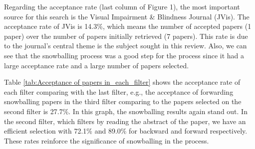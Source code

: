  	\begin{figure}[h] 
   	    \captionsetup{width=16cm}%
	\end{figure}

Regarding the acceptance rate (last column of Figure 1), the most important source for this search is the Visual Impairment \& Blindness Journal (\gls{JVis}). The acceptance rate of \gls{JVis} is 14.3\%, which means the number of accepted papers (1 paper) over the number of papers initially retrieved (7 papers). This rate is due to the journal's central theme is the subject sought in this review. Also, we can see that the snowballing process was a good step for the process since it had a large acceptance rate and a large number of papers selected.

Table \ref{tab:Acceptance of papers in_each_filter} shows the acceptance rate of each filter comparing with the last filter, e.g., the acceptance of forwarding snowballing papers in the third filter comparing to the papers selected on the second filter is 27.7\%. In this graph, the snowballing results again stand out. In the second filter, which filters by reading the abstract of the paper, we have an efficient selection with 72.1\% and 89.0\% for backward and forward respectively. These rates reinforce the significance of snowballing in the process.

